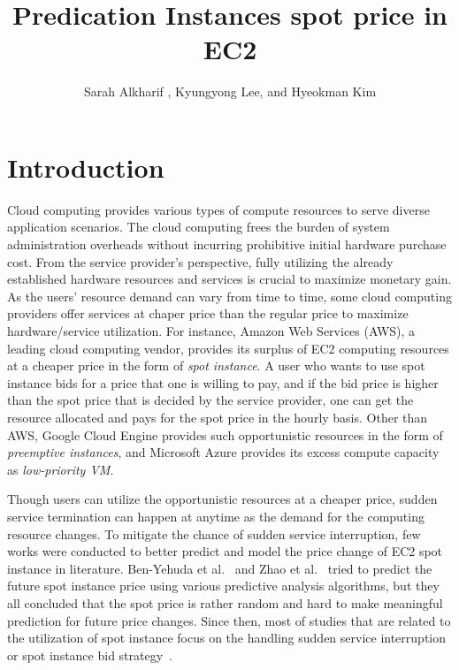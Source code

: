\documentclass[graybox]{svmult}
\begin{document}
\title*{Predication Instances spot price in EC2}
\author{Sarah Alkharif , Kyungyong Lee, and Hyeokman Kim}
%
%
\maketitle


\section{Introduction}\label{sec:1}
Cloud computing provides various types of compute resources to serve diverse application scenarios. The cloud computing frees the burden of system administration overheads without incurring prohibitive initial hardware purchase cost. From the service provider's perspective, fully utilizing the already established hardware resources and services is crucial to maximize monetary gain. As the users' resource demand can vary from time to time, some cloud computing providers offer services at chaper price than the regular price to maximize hardware/service utilization. For instance, Amazon Web Services (AWS), a leading cloud computing vendor, provides its surplus of EC2 computing resources at a cheaper price in the form of \emph{spot instance}. A user who wants to use spot instance bids for a price that one is willing to pay, and if the bid price is higher than the spot price that is decided by the service provider, one can get the resource allocated and pays for the spot price in the hourly basis. Other than AWS, Google Cloud Engine provides such opportunistic resources in the form of \emph{preemptive instances}, and Microsoft Azure provides its excess compute capacity as \emph{low-priority VM}.

Though users can utilize the opportunistic resources at a cheaper price, sudden service termination can happen at anytime as the demand for the computing resource changes. To mitigate the chance of sudden service interruption, few works were conducted to better predict and model the price change of EC2 spot instance in literature. Ben-Yehuda et al.~\cite{spot-instance-pricing-analysis} and Zhao et al.~\cite{spot-price-han-arima} tried to predict the future spot instance price using various predictive analysis algorithms, but they all concluded that the spot price is rather random and hard to make meaningful prediction for future price changes. Since then, most of studies that are related to the utilization of spot instance focus on the handling sudden service interruption~\cite{tr-spark,spot-mpi-checkpoint,flint,deep-spot-cloud} or spot instance bid strategy~\cite{not-bid-cloud,how-to-bid-cloud}. 
\end{document}
